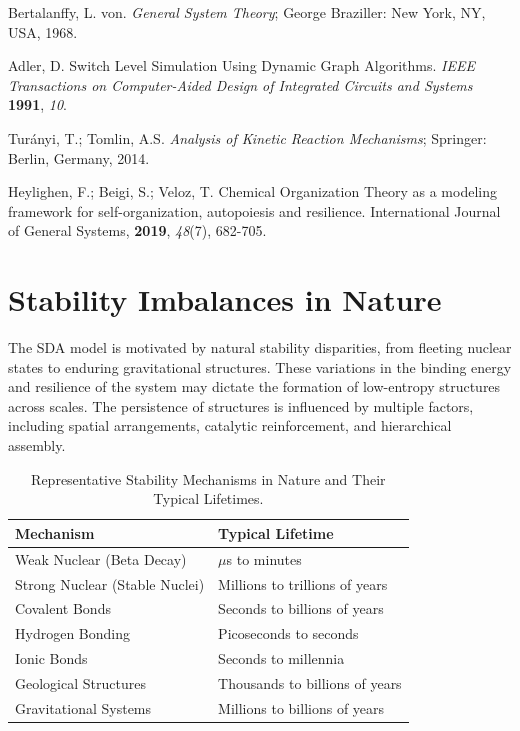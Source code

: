 \documentclass[preprint,12pt]{elsarticle}
\begin{document}
\begin{thebibliography}{999}
Bertalanffy, L. von. \textit{General System Theory}; George Braziller: New York, NY, USA, 1968.

Adler, D. Switch Level Simulation Using Dynamic Graph Algorithms. \textit{IEEE Transactions on Computer-Aided Design of Integrated Circuits and Systems} \textbf{1991}, \textit{10}.

Turányi, T.; Tomlin, A.S. \textit{Analysis of Kinetic Reaction Mechanisms}; Springer: Berlin, Germany, 2014.

Heylighen, F.; Beigi, S.; Veloz, T. Chemical Organization Theory as a modeling framework for self-organization, autopoiesis and resilience. International Journal of General Systems, \textbf{2019}, \textit{48}(7), 682-705.

\end{thebibliography}


\appendix

\section{Stability Imbalances in Nature}

The SDA model is motivated by natural stability disparities, from fleeting nuclear states to enduring gravitational structures. These variations in the binding energy and resilience of the system may dictate the formation of low-entropy structures across scales. The persistence of structures is influenced by multiple factors, including spatial arrangements, catalytic reinforcement, and hierarchical assembly.

\begin{table}
\centering
\caption{Representative Stability Mechanisms in Nature and Their Typical Lifetimes.}
\label{tab:binding-forces}
\footnotesize
\begin{tabular}{l l}
\toprule
\textbf{Mechanism} & \textbf{Typical Lifetime} \\
\midrule
Weak Nuclear (Beta Decay) & $\mu$s to minutes \\
Strong Nuclear (Stable Nuclei) & Millions to trillions of years \\
Covalent Bonds & Seconds to billions of years \\
Hydrogen Bonding & Picoseconds to seconds \\
Ionic Bonds & Seconds to millennia \\
Geological Structures & Thousands to billions of years \\
Gravitational Systems & Millions to billions of years \\
\bottomrule
\end{tabular}
\end{table}
\end{document}
